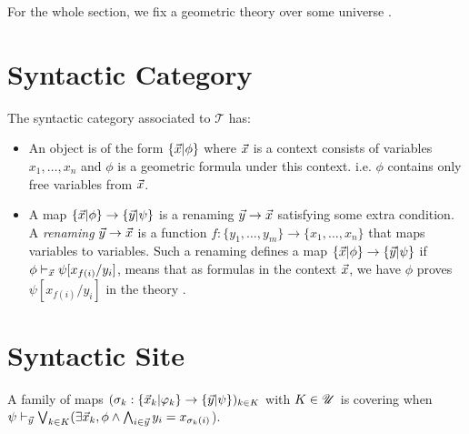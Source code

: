 \newcommand{\tphi}{\tilde{\phi}}
\newcommand{\tpsi}{\tilde{\psi}}
\newcommand{\tzeta}{\tilde{\zeta}}
\newcommand{\ox}{\overline{x}}
\newcommand{\oz}{\overline{z}}

For the whole section, we fix a geometric theory \thT{} over some universe \Univ{}.

\section{Syntactic Category}
\begin{definition}
  \leanok
  The syntactic category associated to $\mathcal{T}$ has:
  \begin{itemize}
    \item An object is of the form $\{ \vec{x} | \phi \}$ where $\vec{x}$ is a context consists of variables $x_1, \ldots, x_{n}$ and $\phi $ is a geometric
    formula under this context. i.e. $\phi$ contains only free variables from $\vec{x}$.
    \item A map $\{ \vec{x} | \phi \}\to \{ \vec{y} | \psi \}$ is a renaming $\vec{y}\to \vec{x}$ satisfying some extra condition. 
    A \emph{renaming} $\vec{y}\to \vec{x}$ is a function $f:\{y_1,\ldots,y_m\}\to \{x_1,\ldots,x_n\}$ that maps variables to variables.
    Such a renaming defines a map $\{ \vec{x} | \phi \}\to \{ \vec{y} | \psi \}$ if $\phi\vdash_{\vec{x}}\psi[x_{f(i)}/y_i]$, means that as formulas in the context $\vec{x}$, we have $\phi$
    proves $\psi[x_{f(i)}/y_i]$ in the theory  \thT{}.
  \end{itemize}
\end{definition}



\section{Syntactic Site}
\begin{definition}
  \label{Def:CoveringFamily}
  \leanok
  A family of maps $(\sigma_k : \{ \vec{x}_k | \varphi_k \}\to \{ \vec{y} | \psi \})_{k \in K}$ with $K \in \mathscr{U}$ is covering when
  $\psi \vdash_{\vec{y}} \bigvee_{k \in K} (\exists \vec{x}_k, \phi \wedge \bigwedge_{i \in \vec{y}} y_i = x_{\sigma_k(i)}$).
\end{definition}


